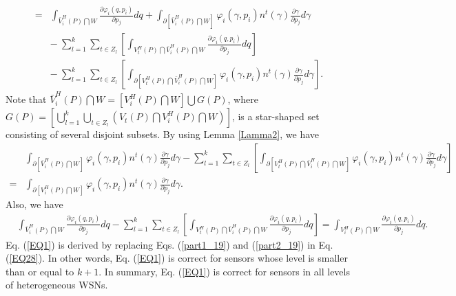 \documentclass[journal,draftcls,onecolumn,12pt,twoside, narroweqnarray]{IEEEtran}
\begin{document}
\begin{IEEEproof}
\begin{equation}
\begin{aligned}
=& \int_{\bar{V}^H_i(P)\bigcap W}\frac{\partial\varphi_i(q,p_i)}{\partial p_j}dq + \int_{\partial\left[\bar{V}^H_i(P)\bigcap W\right]}\varphi_i(\gamma,p_i)n^t(\gamma)\frac{\partial\gamma}{\partial p_j}d\gamma\\
&{-}\:\sum_{l=1}^{k}\sum_{t\in Z_l}\left[\int_{V^H_t(P)\bigcap\bar{V}^H_i(P)\bigcap W}\frac{\partial\varphi_i(q,p_i)}{\partial p_j}dq\right]\\
&{-}\:\sum_{l=1}^{k}\sum_{t\in Z_l}\left[\int_{\partial[V^H_t(P)\bigcap\bar{V}^H_i(P)\bigcap W]}\varphi_i(\gamma,p_i)n^t(\gamma)\frac{\partial\gamma}{\partial p_j}d\gamma\right].
\end{aligned}
\end{equation}
Note that
$\bar{V}^H_i(P)\bigcap W = \left[V^H_i(P)\bigcap W\right]\bigcup G(P)$,
where $G(P)=\left[\bigcup_{l=1}^{k}\bigcup_{t\in Z_l}(V_t(P)\bigcap V^H_i(P)\bigcap W)\right]$,
is a star-shaped set consisting of several disjoint subsets.
By using Lemma \ref{Lamma2}, we have
\begin{equation}
\begin{aligned}
&\int_{\partial\left[\bar{V}^H_i(P)\bigcap W\right]}\varphi_i(\gamma,p_i)n^t(\gamma)\frac{\partial\gamma}{\partial p_j}d\gamma - \sum_{l=1}^{k}\sum_{t\in Z_l}\left[\int_{\partial[V^H_t(P)\bigcap\bar{V}^H_i(P)\bigcap W]}\varphi_i(\gamma,p_i)n^t(\gamma)\frac{\partial\gamma}{\partial p_j}d\gamma\right]\\
=& \int_{\partial\left[V^H_i(P)\bigcap W\right]}\varphi_i(\gamma,p_i)n^t(\gamma)\frac{\partial\gamma}{\partial p_j}d\gamma.
\end{aligned}
\label{part1_19}
\end{equation}
Also, we have
\begin{equation}
\begin{aligned}
& \int_{\bar{V}^H_i(P)\bigcap W}\frac{\partial\varphi_i(q,p_i)}{\partial p_j}dq - \sum_{l=1}^{k}\sum_{t\in Z_l}\left[\int_{V^H_t(P)\bigcap\bar{V}^H_i(P)\bigcap W}\frac{\partial\varphi_i(q,p_i)}{\partial p_j}dq\right] = \int_{V^H_i(P)\bigcap W}\frac{\partial\varphi_i(q,p_i)}{\partial p_j}dq.
\end{aligned}
\label{part2_19}
\end{equation}
Eq. (\ref{EQ1}) is derived by replacing Eqs. (\ref{part1_19}) and (\ref{part2_19}) in Eq. (\ref{EQ28}).
In other words, Eq. (\ref{EQ1}) is correct for sensors whose level is smaller than or equal to $k+1$.
In summary, Eq. (\ref{EQ1}) is correct for sensors in all levels of heterogeneous WSNs.
\end{IEEEproof}
\end{document}
